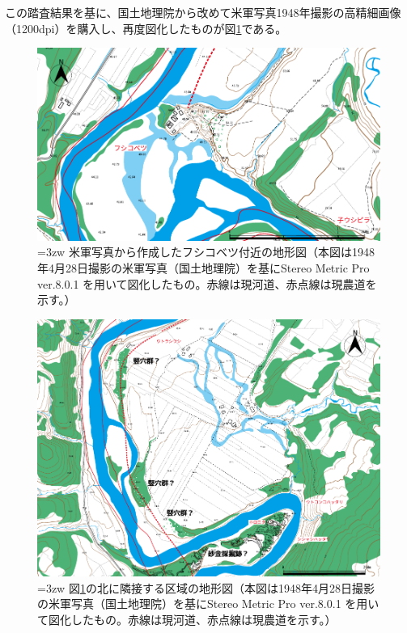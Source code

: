 \documentclass[a4j,11pt,twocolumn,openany]{jsbook}
\begin{document}
この踏査結果を基に、国土地理院から改めて米軍写真1948年撮影の高精細画像（1200dpi）を購入し、再度図化したものが図\ref{miya01fig}である。

\begin{figure}[ht]
	\centering
	\includegraphics[width=0.9\linewidth]{fig/05_Miyamoto/fig01.pdf}
	\caption{\hangindent=3zw
		米軍写真から作成したフシコベツ付近の地形図（本図は1948年4月28日撮影の米軍写真（国土地理院）を基にStereo Metric Pro ver.8.0.1 を用いて図化したもの。赤線は現河道、赤点線は現農道を示す。）}
	\label{miya01fig}
\end{figure}

\begin{figure}[ht]
	\vspace{-0.5\baselineskip}
	\centering
	\includegraphics[width=0.9\linewidth]{fig/05_Miyamoto/fig02.pdf}
	\caption{\hangindent=3zw
		図\ref{miya01fig}の北に隣接する区域の地形図（本図は1948年4月28日撮影の米軍写真（国土地理院）を基にStereo Metric Pro ver.8.0.1 を用いて図化したもの。赤線は現河道、赤点線は現農道を示す。）}
	\label{miya02fig}
\end{figure}
\end{document}
